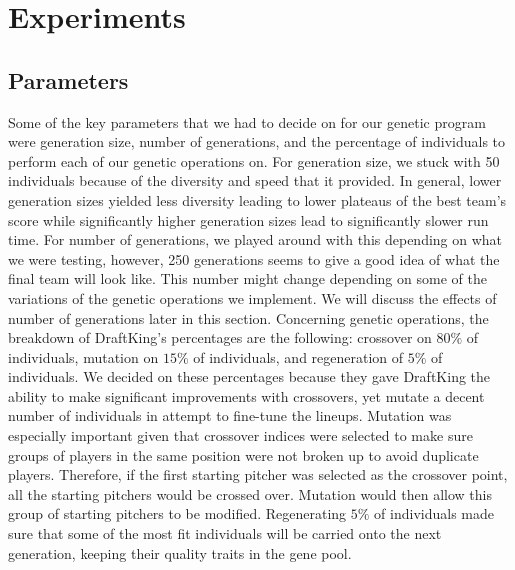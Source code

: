 
\section{Experiments}
\label{sec:expts}

\subsection{Parameters}
\label{subsec:enum}
Some of the key parameters that we had to decide on for our genetic program were generation size, number of generations, and the percentage of individuals to perform each of our genetic operations on. For generation size, we stuck with 50 individuals because of the diversity and speed that it provided. In general, lower generation sizes yielded less diversity leading to lower plateaus of the best team's score while significantly higher generation sizes lead to significantly slower run time. For number of generations, we played around with this depending on what we were testing, however, 250 generations seems to give a good idea of what the final team will look like. This number might change depending on some of the variations of the genetic operations we implement. We will discuss the effects of number of generations later in this section. Concerning genetic operations, the breakdown of DraftKing's percentages are the following: crossover on $80\%$ of individuals, mutation on $15\%$ of individuals, and regeneration of $5\%$ of individuals. We decided on these percentages because they gave DraftKing the ability to make significant improvements with crossovers, yet mutate a decent number of individuals in attempt to fine-tune the lineups. Mutation was especially important given that crossover indices were selected to make sure groups of players in the same position were not broken up to avoid duplicate players. Therefore, if the first starting pitcher was selected as the crossover point, all the starting pitchers would be crossed over. Mutation would then allow this group of starting pitchers to be modified. Regenerating $5\%$ of individuals made sure that some of the most fit individuals will be carried onto the next generation, keeping their quality traits in the gene pool. 


